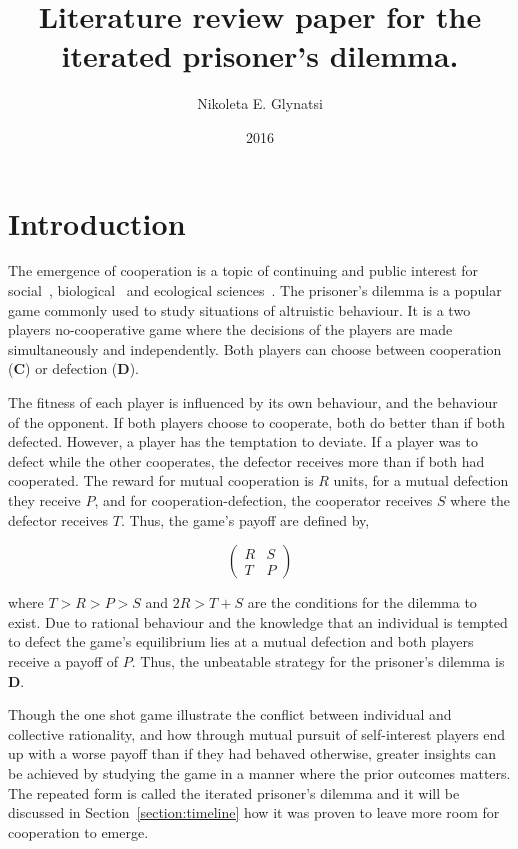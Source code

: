 \documentclass{article}
\title{Literature review paper for the iterated prisoner's dilemma.}
\author{Nikoleta E. Glynatsi}
\date{2016}
\begin{document}
\maketitle

\section{Introduction}\label{section:introduction}

The emergence of cooperation is a topic of continuing and public interest
for social~\cite{capraro2014, gracia2012},
biological~\cite{Douglas2011}
and ecological sciences~\cite{Godfray1992,Krama2012,Milinski1987,Wilkinson1984}.
The prisoner's dilemma is a popular game commonly used to study situations
of altruistic behaviour. It is a two players no-cooperative game where the decisions
of the players are made simultaneously and independently. Both players can
choose between cooperation (\textbf{C}) or defection (\textbf{D}).

The fitness of each player is influenced by its own behaviour, and the behaviour
of the opponent. If both players choose to cooperate, both do better
than if both defected. However, a player has the temptation to deviate. If a
player was to defect while the other cooperates, the defector receives
more than if both had cooperated. The reward for mutual cooperation is \(R\)
units, for a mutual defection they receive \(P\), and for cooperation-defection,
the cooperator receives \(S\) where the defector receives \(T\). Thus, the game's
 payoff are defined by,

\begin{equation} \label{eq:the_pd_payoffs}
	\begin{pmatrix} 
	R & S \\ T & P
	\end{pmatrix}
\end{equation}

where \(T > R > P > S \) and \(2R > T + S\) are the conditions for the dilemma
to exist. Due to rational behaviour and the knowledge that an individual is tempted
to defect the game's equilibrium lies at a mutual defection and both players
receive a payoff of \(P\). Thus, the unbeatable strategy for the prisoner's dilemma
is \textbf{D}.

Though the one shot game illustrate the conflict between individual and collective
rationality, and how through mutual pursuit of self-interest players end up with
a worse payoff than if they had behaved otherwise, greater insights can be achieved 
by studying the game in a manner where the prior outcomes matters. The
repeated form is called the iterated prisoner's dilemma and it will be discussed
in Section~\ref{section:timeline} how it was proven to leave more room for cooperation
to emerge.
\end{document}
